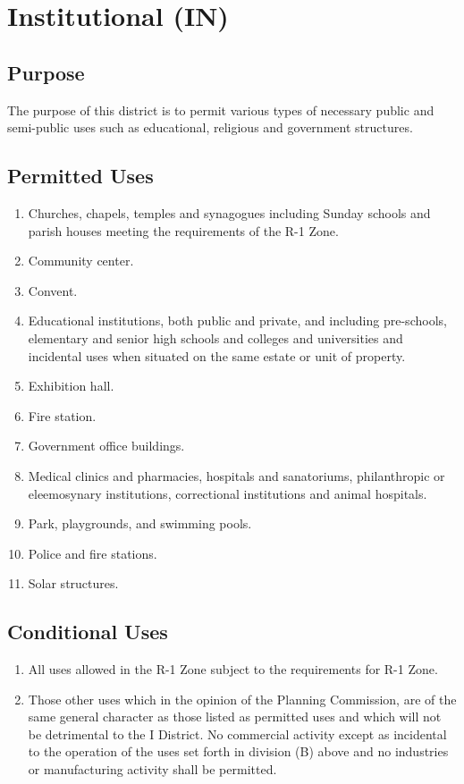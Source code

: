 \setcounter{section}{79}
\section{Institutional (IN)}
\subsection{Purpose}
The purpose of this district is to permit various types of necessary public and semi-public uses such as educational, religious and government structures.
\subsection{Permitted Uses}
\begin{enumerate}[{\indent}1)]
    \item Churches, chapels, temples and synagogues including Sunday schools and parish houses meeting the requirements of the R-1 Zone.
    \item Community center.
    \item Convent.
    \item Educational institutions, both public and private, and including pre-schools, elementary and senior high schools and colleges and universities and incidental uses when situated on the same estate or unit of property.
    \item Exhibition hall.
    \item Fire station.
    \item Government office buildings.
    \item Medical clinics and pharmacies, hospitals and sanatoriums, philanthropic or eleemosynary institutions, correctional institutions and animal hospitals.
    \item Park, playgrounds, and swimming pools.
    \item Police and fire stations.
    \item Solar structures.
\end{enumerate}
\subsection{Conditional Uses}
\begin{enumerate}[{\indent}1)]
    \item All uses allowed in the R-1 Zone subject to the requirements for R-1 Zone.
    \item Those other uses which in the opinion of the Planning Commission, are of the same general character as those listed as permitted uses and which will not be detrimental to the I District.  No commercial activity except as incidental to the operation of the uses set forth in division (B) above and no industries or manufacturing activity shall be permitted.
\end{enumerate}
